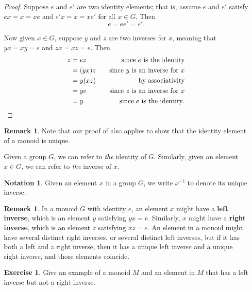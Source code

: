 \documentclass[12pt]{report}
\numberwithin{equation}{section}
\numberwithin{theorem}{chapter}
\theoremstyle{definition}
\newtheorem{exercise}{Exercise}
\newtheorem*{basic properties}{Basic Properties}
\newtheorem*{Important Remark}{Important Remark}
\newtheorem{remark}[theorem]{Remark}
\newtheorem{notation}[theorem]{Notation}
\newcommand{\df}[1]{{\bf #1}\index{#1}}
\begin{document}
\begin{proof}
Suppose $e$ and $e'$ are two identity elements; that is, assume $e$ and $e'$ satisfy $ex = x = xe$ and $e'x = x = xe'$ for all $x \in G$. Then 
$$e = ee' = e'.$$ 

Now given $x \in G$, suppose $y$ and $z$ are two inverses for $x$, meaning that $yx = xy = e$ and $zx = xz = e$. Then 
$$\begin{aligned}
z & = ez &&& \textrm{since $e$ is the identity}\\
& = (yx)z &&& \textrm{since $y$ is an inverse for $x$}\\
& = y(xz) &&& \textrm{by associativity}\\
& = ye &&& \textrm{since $z$ is an inverse for $x$}\\
& = y &&& \textrm{since $e$ is the identity}.\qedhere
\end{aligned}$$
\end{proof}


\begin{remark}
	Note that our proof of  also applies to show that the identity element of a monoid is unique.
\end{remark}


Given a group $G$, we can refer to \emph{the} identity of $G$. Similarly, given an element $x \in G$, we can refer to \emph{the} inverse of $x$.	


\begin{notation}
	Given an element $x$ in a group $G$, we write $x^{-1}$ to denote its unique inverse.
\end{notation}


\begin{remark}\label{note on inverses in monoids}
	In a monoid $G$ with identity $e$, an element $x$ might have a \df{left inverse}, which is an element $y$ satisfying $yx = e$. Similarly, $x$ might have a \df{right inverse}, which is an element $z$ satisfying $xz = e$. An element in a monoid might have several distinct right inverses, or several distinct left inverses, but if it has both a left and a right inverse, then it has a unique left inverse and a unique right inverse, and those elements coincide. 
\end{remark}

\begin{exercise}
	Give an example of a monoid $M$ and an element in $M$ that has a left inverse but not a right inverse.
\end{exercise}
\end{document}
